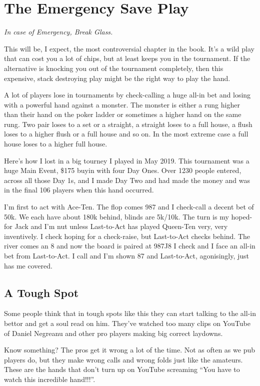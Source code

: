 \chapter{The Emergency Save Play}

\textit{In case of Emergency, Break Glass.}


This will be, I expect, the most controversial chapter in the
book. It's a wild play that can cost you a lot of chips, but at least
keeps you in the tournament. If the alternative is knocking you out of
the tournament completely, then this expensive, stack destroying play
might be the right way to play the hand.

A lot of players lose in tournaments by check-calling a huge all-in
bet and losing with a powerful hand against a monster. The monster is
either a rung higher than their hand on the poker ladder or sometimes
a higher hand on the same rung. Two pair loses to a set or a straight,
a straight loses to a full house, a flush loses to a higher flush or a
full house and so on. In the most extreme case a full house loses to a
higher full house.

Here's how I lost in a big tourney I played in May 2019. This
tournament was a huge Main Event, \$175 buyin with four Day Ones. Over
1230 people entered, across all those Day 1s, and I made Day Two and
had made the money and was in the final 106 players when this hand
occurred.

I'm first to act with Ace-Ten. The flop comes 987 and I check-call a
decent bet of 50k. We each have about 180k behind, blinds are 5k/10k.
The turn is my hoped-for Jack and I'm nut unless Last-to-Act has
played Queen-Ten very, very inventively. I check hoping for a
check-raise, but Last-to-Act checks behind. The river comes an 8 and
now the board is paired at 987J8 I check and I face an all-in bet from
Last-to-Act. I call and I'm shown 87 and Last-to-Act, agonisingly,
just has me covered.

\section{A Tough Spot}

Some people think that in tough spots like this they can start talking
to the all-in bettor and get a soul read on him. They've watched too
many clips on YouTube of Daniel Negreanu and other pro players making
big correct laydowns.

Know something? The pros get it wrong a lot of the time. Not as
often as we pub players do, but they make wrong calls and wrong folds
just like the amateurs. These are the hands that don't turn up on
YouTube screaming ``You have to watch this incredible hand!!!''.

